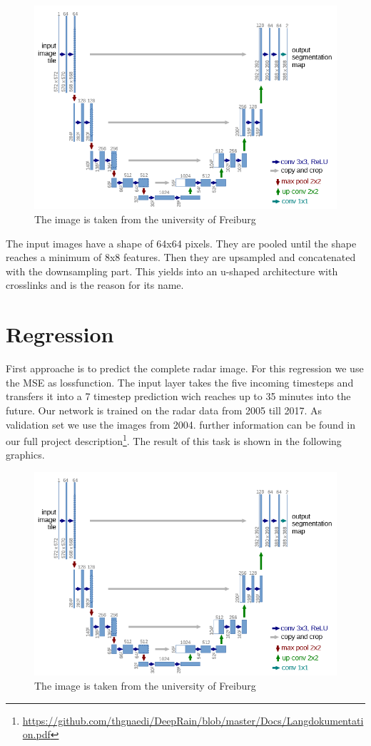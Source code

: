 \documentclass[oneside]{htwg-report}
\begin{document}
\begin{figure}[ht]
\centering
\includegraphics[width=0.8\linewidth]{../pics/UNet_Biomedical}
\caption{The image is taken from the university of Freiburg~\cite{ronneberger2015u}}
\end{figure}

The input images have a shape of 64x64 pixels. They are pooled until the shape reaches a minimum of 8x8 features. Then they are upsampled and concatenated with the downsampling part.
This yields into an u-shaped architecture with crosslinks and is the reason for its name.

\section*{Regression}
First approache is to predict the complete radar image. For this regression we use the MSE as lossfunction. The input layer takes the five incoming timesteps and transfers it into a 7 timestep prediction wich reaches up to 35 minutes into the future.
Our network is trained on the radar data from 2005 till 2017. As validation set we use the images from 2004. further information can be found in our full project description\footnote{\url{https://github.com/thgnaedi/DeepRain/blob/master/Docs/Langdokumentation.pdf}}.
The result of this task is shown in the following graphics.

\begin{figure}[ht]
    \centering
    \includegraphics[width=0.8\linewidth]{../pics/UNet_Biomedical}
    \caption{The image is taken from the university of Freiburg~\cite{ronneberger2015u}}
\end{figure}
\end{document}
